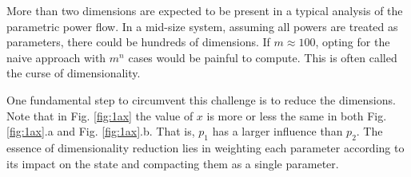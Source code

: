More than two dimensions are expected to be present in a typical analysis of the parametric power flow. In a mid-size system, assuming all powers are treated as parameters, there could be hundreds of dimensions. If $m \approx 100$, opting for the naive approach with $m^n$ cases would be painful to compute. This is often called the curse of dimensionality. 

One fundamental step to circumvent this challenge is to reduce the dimensions. Note that in Fig. \ref{fig:1ax} the value of $x$ is more or less the same in both Fig. \ref{fig:1ax}.a and Fig. \ref{fig:1ax}.b. That is, $p_1$ has a larger influence than $p_2$. The essence of dimensionality reduction lies in weighting each parameter according to its impact on the state and compacting them as a single parameter. 

